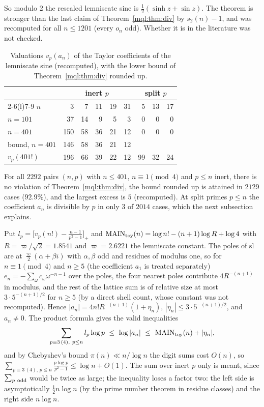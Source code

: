 So modulo $2$ the rescaled lemniscate sine is $\frac12(\sinh z+\sin z)$. The theorem is stronger than the last claim of Theorem~\ref{mql:thm:div} by $s_2(n)-1$, and was recomputed for all $n\le1201$ (every $o_n$ odd). Whether it is in the literature was not checked.

\begin{table}[h]
\centering\small
\begin{tabular}{@{}lrrrrrrrr@{}}
\toprule
& \multicolumn{5}{c}{inert $p$} & \multicolumn{3}{c}{split $p$}\\
\cmidrule(lr){2-6}\cmidrule(l){7-9}
$n$ & 3 & 7 & 11 & 19 & 31 & 5 & 13 & 17\\
\midrule
$n=101$ & 37 & 14 & 9 & 5 & 3 & 0 & 0 & 0\\
$n=401$ & 150 & 58 & 36 & 21 & 12 & 0 & 0 & 0\\
\midrule
bound, $n=401$ & 146 & 58 & 36 & 21 & 12 & & & \\
$v_p(401!)$ & 196 & 66 & 39 & 22 & 12 & 99 & 32 & 24\\
\bottomrule
\end{tabular}
\caption{Valuations $v_p(a_n)$ of the Taylor coefficients of the lemniscate sine (recomputed), with the lower bound of Theorem~\ref{mql:thm:div} rounded up.}\label{mql:tab:lemn}
\end{table}

For all $2292$ pairs $(n,p)$ with $n\le401$, $n\equiv1\pmod4$ and $p\le n$ inert, there is no violation of Theorem~\ref{mql:thm:div}, the bound rounded up is attained in $2129$ cases ($92.9\%$), and the largest excess is $5$ (recomputed). At split primes $p\le n$ the coefficient $a_n$ is divisible by $p$ in only $3$ of $2014$ cases, which the next subsection explains.

\begin{remark}\label{mql:rem:toy}
Put $l_p=\big[v_p(n!)-\frac{n-1}{p^2-1}\big]_+$ and $\mathrm{MAIN}_{\rm toy}(n)=\log n!-(n+1)\log R+\log4$ with $R=\varpi/\sqrt2=1.8541$ and $\varpi=2.6221$ the lemniscate constant. The poles of $\mathrm{sl}$ are at $\frac\varpi2(\alpha+\beta i)$ with $\alpha,\beta$ odd and residues of modulus one, so for $n\equiv1\pmod4$ and $n\ge5$ (the coefficient $a_1$ is treated separately) $e_n=-\sum_\omega c_\omega\omega^{-n-1}$ over the poles, the four nearest poles contribute $4R^{-(n+1)}$ in modulus, and the rest of the lattice sum is of relative size at most $3\cdot5^{-(n+1)/2}$ for $n\ge5$ (by a direct shell count, whose constant was not recomputed). Hence $|a_n|=4n!R^{-(n+1)}(1+\eta_n)$, $|\eta_n|\le3\cdot5^{-(n+1)/2}$, and $a_n\ne0$. The product formula gives the valid inequalities
\[
\sum_{p\equiv3\,(4),\ p\le n}l_p\log p\ \le\ \log|a_n|\ \le\ \mathrm{MAIN}_{\rm toy}(n)+|\eta_n| ,
\]
and by Chebyshev's bound $\pi(n)\ll n/\log n$ the digit sums cost $O(n)$, so $\sum_{p\equiv3\,(4),\,p\le n}\frac{p\log p}{p^2-1}\le\log n+O(1)$. The sum over inert $p$ only is meant, since $\sum_{p\ \rm odd}$ would be twice as large; the inequality loses a factor two: the left side is asymptotically $\frac12n\log n$ (by the prime number theorem in residue classes) and the right side $n\log n$.
\end{remark}

